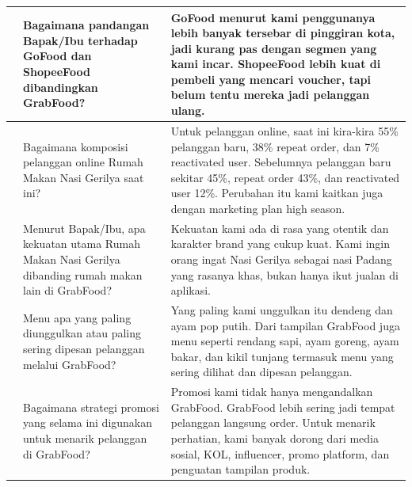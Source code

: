 {\begin{longtable}{|>{\centering\arraybackslash}p{0.7cm}|p{4.4cm}|p{7.8cm}|}
            4            & Bagaimana pandangan Bapak/Ibu terhadap GoFood dan ShopeeFood dibandingkan GrabFood?                                            & GoFood menurut kami penggunanya lebih banyak tersebar di pinggiran kota, jadi kurang pas dengan segmen yang kami incar. ShopeeFood lebih kuat di pembeli yang mencari voucher, tapi belum tentu mereka jadi pelanggan ulang.                                                                                                                  \\ \hline
            5            & Bagaimana komposisi pelanggan online Rumah Makan Nasi Gerilya saat ini?                                                        & Untuk pelanggan online, saat ini kira-kira 55\% pelanggan baru, 38\% repeat order, dan 7\% reactivated user. Sebelumnya pelanggan baru sekitar 45\%, repeat order 43\%, dan reactivated user 12\%. Perubahan itu kami kaitkan juga dengan marketing plan high season.                                                                         \\ \hline
            6            & Menurut Bapak/Ibu, apa kekuatan utama Rumah Makan Nasi Gerilya dibanding rumah makan lain di GrabFood?                         & Kekuatan kami ada di rasa yang otentik dan karakter brand yang cukup kuat. Kami ingin orang ingat Nasi Gerilya sebagai nasi Padang yang rasanya khas, bukan hanya ikut jualan di aplikasi.                                                                                                                                                    \\ \hline
            7            & Menu apa yang paling diunggulkan atau paling sering dipesan pelanggan melalui GrabFood?                                        & Yang paling kami unggulkan itu dendeng dan ayam pop putih. Dari tampilan GrabFood juga menu seperti rendang sapi, ayam goreng, ayam bakar, dan kikil tunjang termasuk menu yang sering dilihat dan dipesan pelanggan.                                                                                                                         \\ \hline
            8            & Bagaimana strategi promosi yang selama ini digunakan untuk menarik pelanggan di GrabFood?                                      & Promosi kami tidak hanya mengandalkan GrabFood. GrabFood lebih sering jadi tempat pelanggan langsung order. Untuk menarik perhatian, kami banyak dorong dari media sosial, KOL, influencer, promo platform, dan penguatan tampilan produk.                                                                                                    \\ \hline

\end{longtable}}
